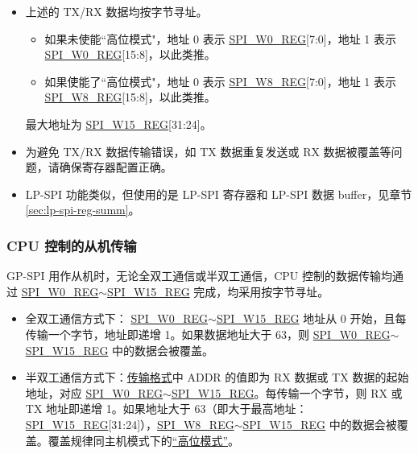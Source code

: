 \documentclass[main\_\_CN.tex]{subfiles}
\begin{document}
\begin{tiplisting}
\vspace{-2em}
\begin{itemize}
    \item 上述的 TX/RX 数据均按字节寻址。
    \begin{itemize}
    \item 如果未使能``高位模式"，地址 0 表示 \hyperref[regdesc:SPIW0REG]{SPI\_W0\_REG}[7:0]，地址 1 表示 \hyperref[regdesc:SPIW0REG]{SPI\_W0\_REG}[15:8]，以此类推。
        \item 如果使能了``高位模式"，地址 0 表示 \hyperref[regdesc:SPIW0REG]{SPI\_W8\_REG}[7:0]，地址 1 表示 \hyperref[regdesc:SPIW0REG]{SPI\_W8\_REG}[15:8]，以此类推。
    \end{itemize}
    最大地址为 \hyperref[regdesc:SPIW0REG]{SPI\_W15\_REG}[31:24]。
    \item 为避免 TX/RX 数据传输错误，如 TX 数据重复发送或 RX 数据被覆盖等问题，请确保寄存器配置正确。
    \item LP-SPI 功能类似，但使用的是 LP-SPI 寄存器和 LP-SPI 数据 buffer，见章节 \ref{sec:lp-spi-reg-summ}。
\end{itemize}
\end{tiplisting}

\subsubsection{CPU 控制的从机传输} \label{GP-SPI slave CPU}

GP-SPI 用作从机时，无论全双工通信或半双工通信，CPU 控制的数据传输均通过 \hyperref[regdesc:SPIW0REG]{SPI\_W0\_REG}$\sim$\hyperref[regdesc:SPIW15REG]{SPI\_W15\_REG} 完成，均采用按字节寻址。

\begin{itemize}
    \item 全双工通信方式下： \hyperref[regdesc:SPIW0REG]{SPI\_W0\_REG}$\sim$\hyperref[regdesc:SPIW15REG]{SPI\_W15\_REG} 地址从 0 开始，且每传输一个字节，地址即递增 1。如果数据地址大于 63，则 \hyperref[regdesc:SPIW0REG]{SPI\_W0\_REG}$\sim$\hyperref[regdesc:SPIW15REG]{SPI\_W15\_REG} 中的数据会被覆盖。
    \item 半双工通信方式下：\hyperref[slave communication format]{传输格式}中 ADDR 的值即为 RX 数据或 TX 数据的起始地址，对应 \hyperref[regdesc:SPIW0REG]{SPI\_W0\_REG}$\sim$\hyperref[regdesc:SPIW15REG]{SPI\_W15\_REG}。每传输一个字节，则 RX 或 TX 地址即递增 1。如果地址大于 63（即大于最高地址： \hyperref[regdesc:SPIW15REG]{SPI\_W15\_REG}[31:24]），\hyperref[regdesc:SPIW0REG]{SPI\_W8\_REG}$\sim$\hyperref[regdesc:SPIW0REG]{SPI\_W15\_REG} 中的数据会被覆盖。覆盖规律同主机模式下的\hyperref[GP-SPI Master CPU]{“高位模式”}。
\end{itemize}
\end{document}
